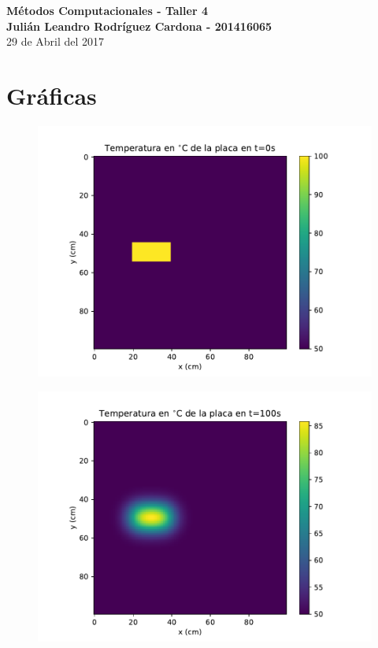 \documentclass[12pt,letterpaper]{article}
\begin{document}
\begin{center}
{\Large \textbf{Métodos Computacionales - Taller 4}}\\
\vspace{0.3cm}
\textbf{Julián Leandro Rodríguez Cardona - 201416065}\\ \vspace{0.3cm}
29 de Abril del 2017
\end{center}

\section*{Gráficas}


\begin{figure}[ht]
\includegraphics{f1_0.pdf}
\centering
\end{figure}

\begin{figure}[ht]
\includegraphics{f1_100.pdf}
\centering
\end{figure}
\end{document}
